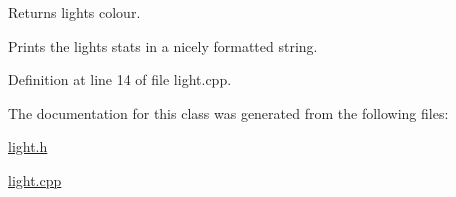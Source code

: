 Returns light\textquotesingle{}s colour. 

Prints the light\textquotesingle{}s stats in a nicely formatted string. 

Definition at line 14 of file light.\+cpp.



The documentation for this class was generated from the following files\+:\begin{DoxyCompactItemize}
\item 
\mbox{\hyperlink{light_8h}{light.\+h}}\item 
\mbox{\hyperlink{light_8cpp}{light.\+cpp}}\end{DoxyCompactItemize}
